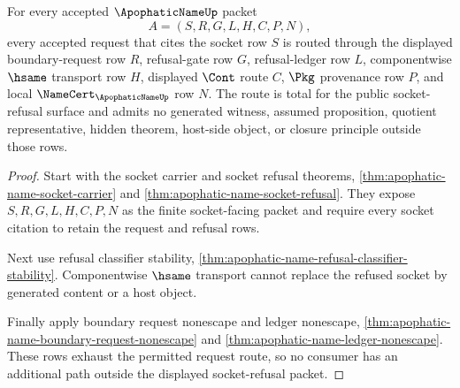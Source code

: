 \begin{theorem}
\label{thm:apophatic-name-socket-refusal-route-totality}
For every accepted $\ApophaticNameUp$ packet
$$
A=(S,R,G,L,H,C,P,N),
$$
every accepted request that cites the socket row $S$ is routed through the displayed boundary-request row $R$, refusal-gate row $G$, refusal-ledger row $L$, componentwise $\hsame$ transport row $H$, displayed $\Cont$ route $C$, $\Pkg$ provenance row $P$, and local $\NameCert_{\ApophaticNameUp}$ row $N$. The route is total for the public socket-refusal surface and admits no generated witness, assumed proposition, quotient representative, hidden theorem, host-side object, or closure principle outside those rows.
\end{theorem}
\begin{proof}
Start with the socket carrier and socket refusal theorems, \autoref{thm:apophatic-name-socket-carrier} and \autoref{thm:apophatic-name-socket-refusal}. They expose $S,R,G,L,H,C,P,N$ as the finite socket-facing packet and require every socket citation to retain the request and refusal rows.

Next use refusal classifier stability, \autoref{thm:apophatic-name-refusal-classifier-stability}. Componentwise $\hsame$ transport cannot replace the refused socket by generated content or a host object.

Finally apply boundary request nonescape and ledger nonescape, \autoref{thm:apophatic-name-boundary-request-nonescape} and \autoref{thm:apophatic-name-ledger-nonescape}. These rows exhaust the permitted request route, so no consumer has an additional path outside the displayed socket-refusal packet.
\end{proof}

